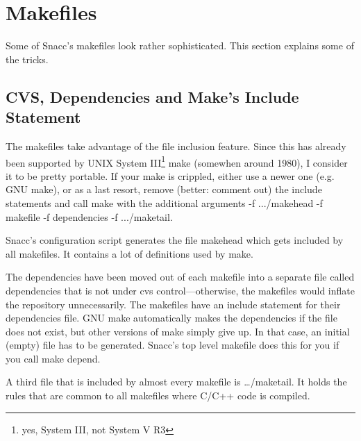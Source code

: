 
%
%
%

\chapter{\label{makefile-sect}Makefiles}

Some of Snacc's makefiles look rather sophisticated.
This section explains some of the tricks.

\section{CVS, Dependencies and Make's Include Statement}

The makefiles take advantage of the file inclusion feature.
Since this has already been supported by UNIX System III\footnote{yes, System III, not System V R3} make (somewhen around 1980), I consider it to be pretty portable.
If your make is crippled, either use a newer one (e.g. GNU make), or as a last resort, remove (better: comment out) the include statements and call make with the additional arguments {\ufn -f .../makehead -f makefile -f dependencies -f .../maketail}.

Snacc's configuration script generates the file {\ufn makehead} which gets included by all makefiles.
It contains a lot of definitions used by make.

The dependencies have been moved out of each makefile into a separate file called {\ufn dependencies} that is not under cvs control---otherwise, the makefiles would inflate the repository unnecessarily.
The makefiles have an include statement for their dependencies file.
GNU make automatically makes the dependencies if the file does not exist, but other versions of {\ufn make} simply give up.
In that case, an initial (empty) file has to be generated.
Snacc's top level makefile does this for you if you call {\ufn make depend}.

A third file that is included by almost every makefile is {\ufn \dots/maketail}.
It holds the rules that are common to all makefiles where C/C++ code is compiled.

